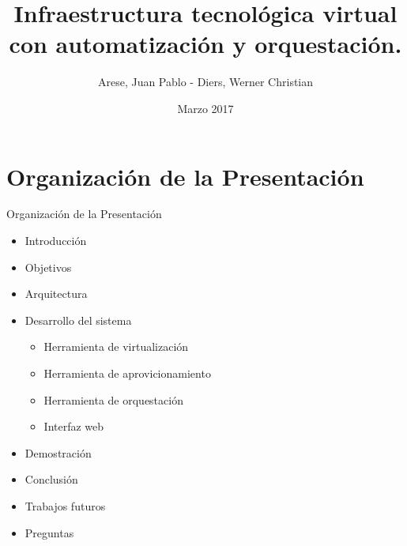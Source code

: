 \usepackage[english]{babel}
\usepackage[utf8x]{inputenc}

\title[Your Short Title]{Infraestructura tecnológica virtual con automatización y orquestación.}
\author{Arese, Juan Pablo - Diers, Werner Christian}
\date{Marzo 2017}




\begin{frame}
  \titlepage
\end{frame}


\section{Organización de la Presentación}

\begin{frame}{Organización de la Presentación}
    \vspace{-1cm}
    \begin{itemize}
        \item Introducción
        \item Objetivos
        \item Arquitectura
        \item Desarrollo del sistema
        \begin{itemize}
            \item Herramienta de virtualización
            \item Herramienta de aprovicionamiento
            \item Herramienta de orquestación
            \item Interfaz web
        \end{itemize}
        \item Demostración
        \item Conclusión
        \item Trabajos futuros
        \item Preguntas
    \end{itemize}

\end{frame}


